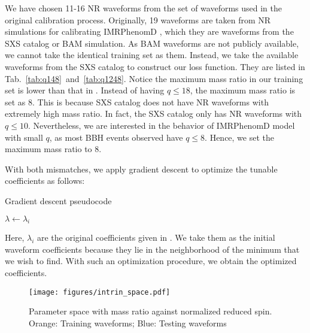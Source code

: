 \documentclass[twocolumn]{aastex631}
\begin{document}
We have chosen 11-16 NR waveforms from the set of waveforms used in the original
calibration process. Originally, 19 waveforms are taken from NR simulations for
calibrating IMRPhenomD \citep{khan2016frequency,husa2016frequency}, which they
are waveforms from the SXS catalog or BAM simulation. As BAM waveforms are not
publicly available, we cannot take the identical training set as them. Instead,
we take the available waveforms from the SXS catalog to construct our loss
function. They are listed in Tab.~\ref{tab:q148}~and~\ref{tab:q1248}. Notice the
maximum mass ratio in our training set is lower than that in
\citep{khan2016frequency}. Instead of having $q\leq18$, the maximum mass ratio
is set as 8. This is because SXS catalog does not have NR waveforms with
extremely high mass ratio. In fact, the SXS catalog only has NR waveforms with
$q\leq10$. Nevertheless, we are interested in the behavior of IMRPhenomD model
with small $q$, as most BBH events observed have $q\leq8$. Hence, we set the
maximum mass ratio to 8. 

With both mismatches, we apply gradient descent to optimize the tunable
coefficients as follows: 
\begin{algorithm}
	\caption{Gradient descent pseudocode}
	    $\lambda\leftarrow\lambda_i$\\
	 \Return{$\lambda$}
\end{algorithm}
Here, $\lambda_i$ are the original coefficients given in
\citep{khan2016frequency}. We take them as the initial waveform coefficients
because they lie in the neighborhood of the minimum that we wish to find. With
such an optimization procedure, we obtain the optimized coefficients. 

\begin{figure}[t]
	\centering
	\texttt{[image: figures/intrin\_space.pdf]}
	\caption{Parameter space with mass ratio against normalized reduced spin. Orange: Training waveforms; Blue: Testing waveforms}
	\label{fig:intrin_space}
\end{figure}
\end{document}
